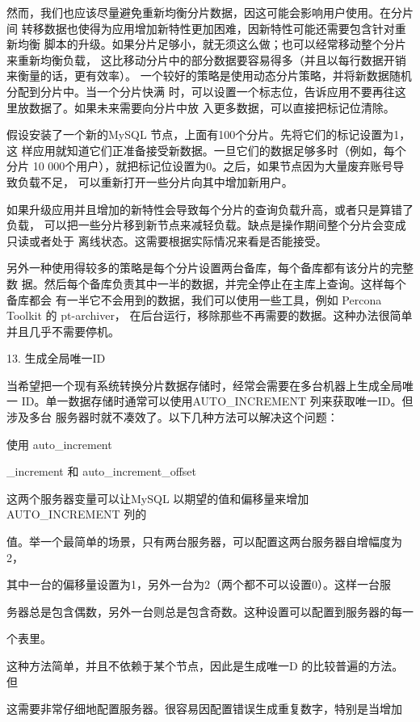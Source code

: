 然而，我们也应该尽量避免重新均衡分片数据，因这可能会影响用户使用。在分片间
转移数据也使得为应用增加新特性更加困难，因新特性可能还需要包含针对重新均衡
脚本的升级。如果分片足够小，就无须这么做；也可以经常移动整个分片来重新均衡负载，
这比移动分片中的部分数据要容易得多（并且以每行数据开销来衡量的话，更有效率）。
一个较好的策略是使用动态分片策略，并将新数据随机分配到分片中。当一个分片快满
时，可以设置一个标志位，告诉应用不要再往这里放数据了。如果未来需要向分片中放
入更多数据，可以直接把标记位清除。

假设安装了一个新的MySQL 节点，上面有100个分片。先将它们的标记设置为1，这
样应用就知道它们正准备接受新数据。一旦它们的数据足够多时（例如，每个分片
10 000个用户），就把标记位设置为0。之后，如果节点因为大量废弃账号导致负载不足，
可以重新打开一些分片向其中增加新用户。

如果升级应用并且增加的新特性会导致每个分片的查询负载升高，或者只是算错了负载，
可以把一些分片移到新节点来减轻负载。缺点是操作期间整个分片会变成只读或者处于
离线状态。这需要根据实际情况来看是否能接受。

另外一种使用得较多的策略是每个分片设置两台备库，每个备库都有该分片的完整数
据。然后每个备库负责其中一半的数据，并完全停止在主库上查询。这样每个备库都会
有一半它不会用到的数据，我们可以使用一些工具，例如 Percona Toolkit 的 pt-archiver，
在后台运行，移除那些不再需要的数据。这种办法很简单并且几乎不需要停机。

13. 生成全局唯一ID

当希望把一个现有系统转换分片数据存储时，经常会需要在多台机器上生成全局唯一
ID。单一数据存储时通常可以使用AUTO\_INCREMENT 列来获取唯一ID。但涉及多台
服务器时就不凑效了。以下几种方法可以解决这个问题：

使用 auto\_increment

\_increment 和 auto\_increment\_offset

这两个服务器变量可以让MySQL 以期望的值和偏移量来增加 AUTO\_INCREMENT 列的

值。举一个最简单的场景，只有两台服务器，可以配置这两台服务器自增幅度为2，

其中一台的偏移量设置为1，另外一台为2（两个都不可以设置0）。这样一台服

务器总是包含偶数，另外一台则总是包含奇数。这种设置可以配置到服务器的每一

个表里。

这种方法简单，并且不依赖于某个节点，因此是生成唯一D 的比较普遍的方法。但

这需要非常仔细地配置服务器。很容易因配置错误生成重复数字，特别是当增加

